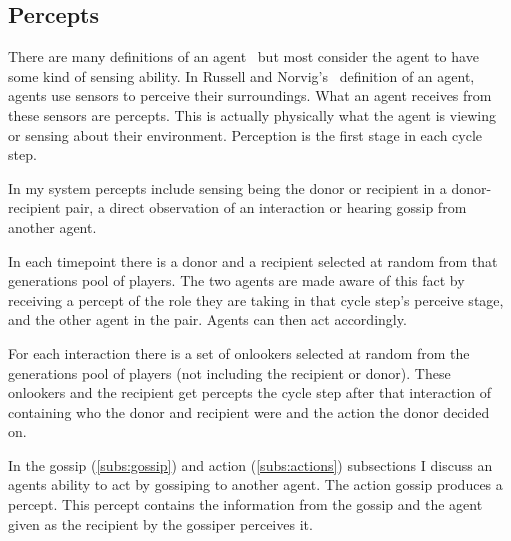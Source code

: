\documentclass[]{final_report}
\begin{document}
\subsection{Percepts}
\label{subs:percepts}
There are many definitions of an agent~\cite{franklin1996agent} but most consider the agent to have some kind of sensing ability. In Russell and Norvig's~\cite{russell2016artificial} definition of an agent, agents use sensors to perceive their surroundings. What an agent receives from these sensors are percepts. This is actually physically what the agent is viewing or sensing about their environment. Perception is the first stage in each cycle step.\par
In my system percepts include sensing being the donor or recipient in a donor-recipient pair, a direct observation of an interaction or hearing gossip from another agent.\par
In each timepoint there is a donor and a recipient selected at random from that generations pool of players. The two agents are made aware of this fact by receiving a percept of the role they are taking in that cycle step's perceive stage, and the other agent in the pair. Agents can then act accordingly.\par
For each interaction there is a set of onlookers selected at random from the generations pool of players (not including the recipient or donor). These onlookers and the recipient get percepts the cycle step after that interaction of containing who the donor and recipient were and the action the donor decided on.\par
In the gossip (\ref{subs:gossip}) and action (\ref{subs:actions}) subsections I discuss an agents ability to act by gossiping to another agent. The action gossip produces a percept. This percept contains the information from the gossip and the agent given as the recipient by the gossiper perceives it.
\end{document}
